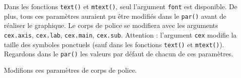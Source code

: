 \documentclass[]{article}
\newenvironment{Shaded}{\begin{snugshade}}{\end{snugshade}}
\newcommand{\CommentTok}[1]{\textcolor[rgb]{0.56,0.35,0.01}{\textit{#1}}}
\newcommand{\KeywordTok}[1]{\textcolor[rgb]{0.13,0.29,0.53}{\textbf{#1}}}
\newcommand{\NormalTok}[1]{#1}
\newcommand{\StringTok}[1]{\textcolor[rgb]{0.31,0.60,0.02}{#1}}
\begin{document}
Dans les fonctions \texttt{text()} et \texttt{mtext()}, seul l'argument \texttt{font} est disponible.
De plus, tous ces paramètres auraient pu être modifiés dans le \texttt{par()} avant de
réaliser le graphique. Le corps de police se modifiera avec les arguments
\texttt{cex.axis}, \texttt{cex.lab}, \texttt{cex.main}, \texttt{cex.sub}. Attention : l'argument \texttt{cex}
modifie la taille des symboles ponctuels (sauf dans les fonctions \texttt{text()} et
\texttt{mtext()}). Regardons dans le \texttt{par()} les valeurs par défaut de chacun de ces
paramètres.

\begin{Shaded}
\end{Shaded}

Modifions ces paramètres de corps de police.
\end{document}
